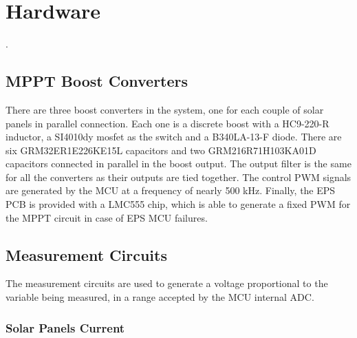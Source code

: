%
%
%
%
%

%
%
%
%
%
%

\chapter{Hardware} \label{ch:hardware}

.

\section{MPPT Boost Converters}

There are three boost converters in the system, one for each couple of solar panels in parallel connection. Each one is a discrete boost with a HC9-220-R inductor, a SI4010dy mosfet as the switch and a B340LA-13-F diode. There are six GRM32ER1E226KE15L capacitors and two GRM216R71H103KA01D capacitors connected in parallel in the boost output. The output filter is the same for all the converters as their outputs are tied together. The control PWM signals are generated by the MCU at a frequency of nearly 500 kHz. Finally, the EPS PCB is provided with a LMC555 chip, which is able to generate a fixed PWM for the MPPT circuit in case of EPS MCU failures.

\section{Measurement Circuits}

The measurement circuits are used to generate a voltage proportional to the variable being measured, in a range accepted by the MCU internal ADC.

\subsection{Solar Panels Current}

